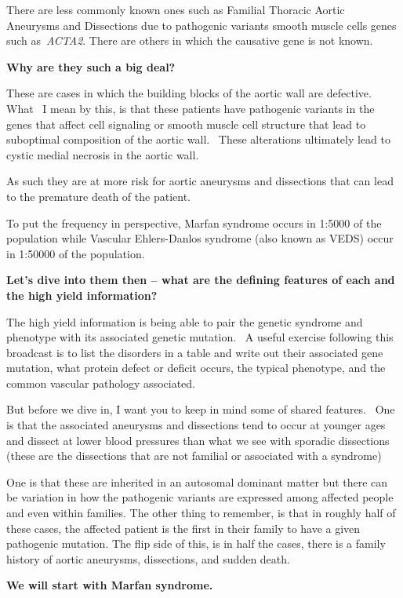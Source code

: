 \documentclass[
]{book}
\begin{document}
There are less commonly known ones such as Familial Thoracic Aortic
Aneurysms and Dissections due to pathogenic variants smooth muscle cells
genes such as~\emph{ACTA2}. There are others in which the causative gene is
not known.

\textbf{Why are they such a big deal?}

These are cases in which the building blocks of the aortic wall are
defective. What~ I mean by this, is that these patients have pathogenic
variants in the genes that affect cell signaling or smooth muscle cell
structure that lead to suboptimal composition of the aortic wall.~ These
alterations ultimately lead to cystic medial necrosis in the aortic
wall.

As such they are at more risk for aortic aneurysms and dissections that
can lead to the premature death of the patient.

To put the frequency in perspective, Marfan syndrome occurs in 1:5000 of
the population while Vascular Ehlers-Danlos syndrome (also known as
VEDS) occur in 1:50000 of the population.

\textbf{Let's dive into them then -- what are the defining features of each
and the high yield information?}

The high yield information is being able to pair the genetic syndrome
and phenotype with its associated genetic mutation.~ A useful exercise
following this broadcast is to list the disorders in a table and write
out their associated gene mutation, what protein defect or deficit
occurs, the typical phenotype, and the common vascular pathology
associated.

But before we dive in, I want you to keep in mind some of shared
features.~ One is that the associated aneurysms and dissections tend to
occur at younger ages and dissect at lower blood pressures than what we
see with sporadic dissections (these are the dissections that are not
familial or associated with a syndrome)

One is that these are inherited in an autosomal dominant matter but
there can be variation in how the pathogenic variants are expressed
among affected people and even within families. The other thing to
remember, is that in roughly half of these cases, the affected patient
is the first in their family to have a given pathogenic mutation. The
flip side of this, is in half the cases, there is a family history of
aortic aneurysms, dissections, and sudden death.

\textbf{We will start with Marfan syndrome.}
\end{document}
